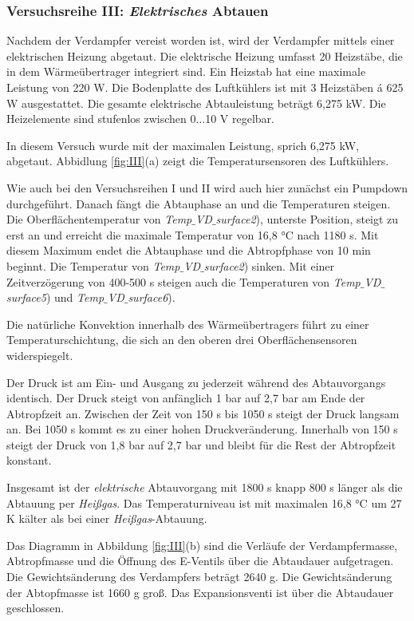 \newpage
\subsubsection*{Versuchsreihe III:  \textit{Elektrisches} Abtauen}

Nachdem der Verdampfer vereist worden ist, wird der Verdampfer mittels einer elektrischen Heizung abgetaut. Die elektrische Heizung umfasst 20 Heizstäbe, die in dem Wärmeübertrager integriert sind. Ein Heizstab hat eine maximale Leistung von 220 W. Die Bodenplatte des Luftkühlers ist mit 3 Heizstäben á 625 W ausgestattet. Die gesamte elektrische Abtauleistung beträgt 6,275 kW. Die Heizelemente sind stufenlos zwischen 0$\dots$10 V regelbar.  

In diesem Versuch wurde mit der maximalen Leistung, sprich 6,275 kW, abgetaut. Abbidlung \ref{fig:III}(a) zeigt die Temperatursensoren des Luftkühlers. 

Wie auch bei den Versuchsreihen I und II wird auch hier zunächst ein Pumpdown durchgeführt. Danach fängt die Abtauphase an und die Temperaturen steigen. Die Oberflächentemperatur von \textit{Temp$\_$VD$\_$surface2}), unterste Position,  steigt zu erst an und erreicht die maximale Temperatur von 16,8 °C nach 1180 s. Mit diesem Maximum endet die Abtauphase und die Abtropfphase von 10 min beginnt. Die Temperatur von \textit{Temp$\_$VD$\_$surface2}) sinken. 
Mit einer Zeitverzögerung von 400-500 s steigen auch die Temperaturen von \textit{Temp$\_$VD$\_$surface5}) und \textit{Temp$\_$VD$\_$surface6}).

Die natürliche Konvektion innerhalb des Wärmeübertragers führt zu einer Temperaturschichtung, die sich an den oberen drei Oberflächensensoren widerspiegelt.  

Der Druck ist am Ein- und Ausgang zu jederzeit während des Abtauvorgangs identisch. Der Druck steigt von anfänglich 1 bar auf 2,7 bar am Ende der Abtropfzeit an. Zwischen der Zeit von 150 s bis 1050 s steigt der Druck langsam an. Bei 1050 s kommt es zu einer hohen Druckveränderung. Innerhalb von 150 s steigt der Druck von 1,8 bar auf 2,7 bar und bleibt für die Rest der Abtropfzeit konstant. 

Insgesamt ist der \textit{elektrische} Abtauvorgang mit 1800 s knapp 800 s länger als die Abtauung per \textit{Heißgas}. Das Temperaturniveau ist mit maximalen 16,8 °C um 27 K kälter als bei einer \textit{Heißgas}-Abtauung. 

Das Diagramm in Abbildung \ref{fig:III}(b) sind die Verläufe der Verdampfermasse, Abtropfmasse und die Öffnung des E-Ventils über die Abtaudauer aufgetragen. Die Gewichtsänderung des Verdampfers beträgt 2640 g. Die Gewichtsänderung der Abtopfmasse ist 1660 g groß. Das Expansionsventi ist über die Abtaudauer geschlossen. 


